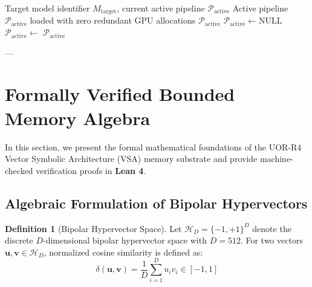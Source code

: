 \documentclass[11pt,a4paper]{article}
\theoremstyle{plain}
\theoremstyle{definition}
\newtheorem{definition}[theorem]{Definition}
\theoremstyle{remark}
\begin{document}
\begin{algorithm}[t]
\caption{Single-Pipeline Deterministic Memory Management}
\label{alg:lifecycle}
\begin{algorithmic}[1]
\Require Target model identifier $M_{\text{target}}$, current active pipeline $\mathcal{P}_{\text{active}}$
\Ensure Active pipeline $\mathcal{P}_{\text{active}}$ loaded with zero redundant GPU allocations
    \State \Return $\mathcal{P}_{\text{active}}$ 
\EndIf
{}
    \State {}
    \State {}
    \State $\mathcal{P}_{\text{active}} \gets \text{NULL}$
\EndIf
\State $\mathcal{P}_{\text{active}} \gets$ 
\State \Return $\mathcal{P}_{\text{active}}$
\end{algorithmic}
\end{algorithm}

---

\section{Formally Verified Bounded Memory Algebra}
\label{sec:formal_math}

In this section, we present the formal mathematical foundations of the UOR-R4 Vector Symbolic Architecture (VSA) memory substrate and provide machine-checked verification proofs in \textbf{Lean 4}.

\subsection{Algebraic Formulation of Bipolar Hypervectors}

\begin{definition}[Bipolar Hypervector Space]
Let $\mathcal{H}_D = \{-1, +1\}^D$ denote the discrete $D$-dimensional bipolar hypervector space with $D = 512$. For two vectors $\bm{u}, \bm{v} \in \mathcal{H}_D$, normalized cosine similarity is defined as:
\begin{equation}
\delta(\bm{u}, \bm{v}) = \frac{1}{D} \sum_{i=1}^D u_i v_i \in [-1, 1]
\label{eq:vsa_sim}
\end{equation}
\end{definition}
\end{document}
